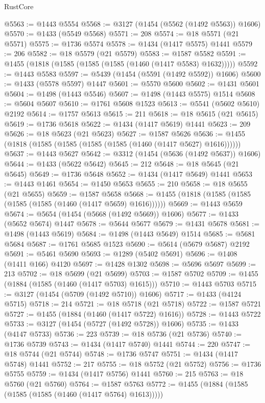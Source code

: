 \begin{lexlean}{RustCore}
\begin{coremodule}
@5563 := @1443 @5554
@5568 := @3127 (@1454 (@5562 (@1492 @5563)) @1606)
@5570 := @1433 (@5549 @5568)
@5571 := 208
@5574 := @18 @5571 (@21 @5571)
@5575 := @1736 @5574
@5578 := @1434 (@1417 @5575) @1441
@5579 := 206
@5582 := @18 @5579 (@21 @5579)
@5583 := @1587 @5582
@5591 := @1455 (@1818 (@1585 (@1585 (@1585 (@1460 (@1417 @5583) @1632)))))
@5592 := @1443 @5583
@5597 := @5439 (@1454 (@5591 (@1492 @5592)) @1606)
@5600 := @1433 (@5578 @5597) @1447
@5601 := @5570 @5600
@5602 := @1431 @5601
@5604 := @1498 (@1443 @5546)
@5607 := @1498 (@1443 @5575) @1514
@5608 := @5604 @5607
@5610 := @1761 @5608 @1523
@5613 := @5541 (@5602 @5610) @2192
@5614 := @1757 @5613
@5615 := 211
@5618 := @18 @5615 (@21 @5615)
@5619 := @1736 @5618
@5622 := @1434 (@1417 @5619) @1441
@5623 := 209
@5626 := @18 @5623 (@21 @5623)
@5627 := @1587 @5626
@5636 := @1455 (@1818 (@1585 (@1585 (@1585 (@1585 (@1460 (@1417 @5627) @1616))))))
@5637 := @1443 @5627
@5642 := @3312 (@1454 (@5636 (@1492 @5637)) @1606)
@5644 := @1433 (@5622 @5642)
@5645 := 212
@5648 := @18 @5645 (@21 @5645)
@5649 := @1736 @5648
@5652 := @1434 (@1417 @5649) @1441
@5653 := @1443 @1461
@5654 := @1450 @5653
@5655 := 210
@5658 := @18 @5655 (@21 @5655)
@5659 := @1587 @5658
@5668 := @1455 (@1818 (@1585 (@1585 (@1585 (@1585 (@1460 (@1417 @5659) @1616))))))
@5669 := @1443 @5659
@5674 := @5654 (@1454 (@5668 (@1492 @5669)) @1606)
@5677 := @1433 (@5652 @5674) @1447
@5678 := @5644 @5677
@5679 := @1431 @5678
@5681 := @1498 (@1443 @5619)
@5684 := @1498 (@1443 @5649) @1514
@5685 := @5681 @5684
@5687 := @1761 @5685 @1523
@5690 := @5614 (@5679 @5687) @2192
@5691 := @5461 @5690
@5693 := @1289 (@5402 @5691)
@5696 := @1408 (@1411 @166) @4120
@5697 := @1428 @1302
@5698 := @5696 @5697
@5699 := 213
@5702 := @18 @5699 (@21 @5699)
@5703 := @1587 @5702
@5709 := @1455 (@1884 (@1585 (@1460 (@1417 @5703) @1615)))
@5710 := @1443 @5703
@5715 := @3127 (@1454 (@5709 (@1492 @5710)) @1606)
@5717 := @1433 (@4124 @5715)
@5718 := 214
@5721 := @18 @5718 (@21 @5718)
@5722 := @1587 @5721
@5727 := @1455 (@1884 (@1460 (@1417 @5722) @1616))
@5728 := @1443 @5722
@5733 := @3127 (@1454 (@5727 (@1492 @5728)) @1606)
@5735 := @1433 (@4147 @5733)
@5736 := 223
@5739 := @18 @5736 (@21 @5736)
@5740 := @1736 @5739
@5743 := @1434 (@1417 @5740) @1441
@5744 := 220
@5747 := @18 @5744 (@21 @5744)
@5748 := @1736 @5747
@5751 := @1434 (@1417 @5748) @1441
@5752 := 217
@5755 := @18 @5752 (@21 @5752)
@5756 := @1736 @5755
@5759 := @1434 (@1417 @5756) @1441
@5760 := 215
@5763 := @18 @5760 (@21 @5760)
@5764 := @1587 @5763
@5772 := @1455 (@1884 (@1585 (@1585 (@1585 (@1460 (@1417 @5764) @1613)))))

\end{coremodule}
\end{lexlean}
